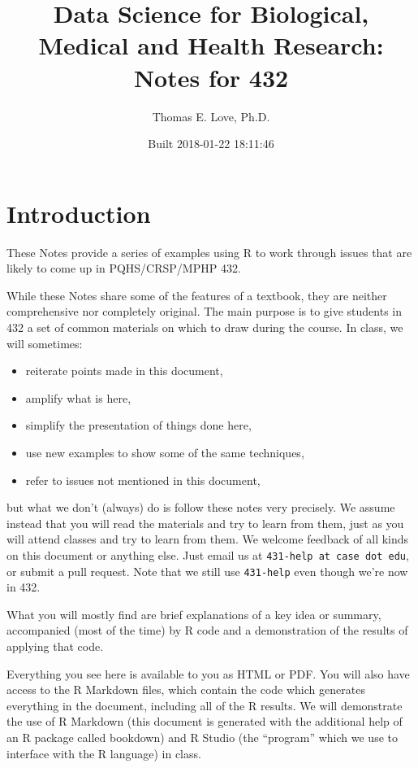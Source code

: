 \documentclass[]{book}
\title{Data Science for Biological, Medical and Health Research: Notes for 432}
\author{Thomas E. Love, Ph.D.}
\date{Built 2018-01-22 18:11:46}
\providecommand{\tightlist}{%
  \setlength{\itemsep}{0pt}\setlength{\parskip}{0pt}}
\theoremstyle{definition}
\theoremstyle{definition}
\theoremstyle{definition}
\theoremstyle{remark}
\begin{document}
\maketitle

{
\setcounter{tocdepth}{1}
\tableofcontents
}
\chapter*{Introduction}\label{introduction}

These Notes provide a series of examples using R to work through issues
that are likely to come up in PQHS/CRSP/MPHP 432.

While these Notes share some of the features of a textbook, they are
neither comprehensive nor completely original. The main purpose is to
give students in 432 a set of common materials on which to draw during
the course. In class, we will sometimes:

\begin{itemize}
\tightlist
\item
  reiterate points made in this document,
\item
  amplify what is here,
\item
  simplify the presentation of things done here,
\item
  use new examples to show some of the same techniques,
\item
  refer to issues not mentioned in this document,
\end{itemize}

but what we don't (always) do is follow these notes very precisely. We
assume instead that you will read the materials and try to learn from
them, just as you will attend classes and try to learn from them. We
welcome feedback of all kinds on this document or anything else. Just
email us at \texttt{431-help\ at\ case\ dot\ edu}, or submit a pull
request. Note that we still use \texttt{431-help} even though we're now
in 432.

What you will mostly find are brief explanations of a key idea or
summary, accompanied (most of the time) by R code and a demonstration of
the results of applying that code.

Everything you see here is available to you as HTML or PDF. You will
also have access to the R Markdown files, which contain the code which
generates everything in the document, including all of the R results. We
will demonstrate the use of R Markdown (this document is generated with
the additional help of an R package called bookdown) and R Studio (the
``program'' which we use to interface with the R language) in class.
\end{document}
